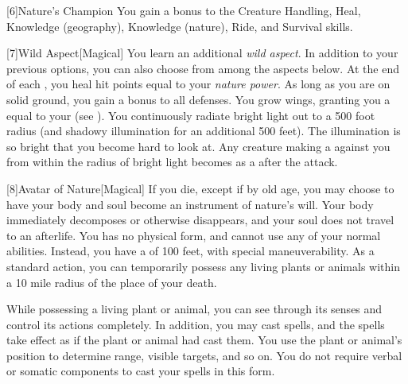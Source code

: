         [6]{Nature's Champion}
        You gain a  bonus to the Creature Handling, Heal, Knowledge (geography), Knowledge (nature), Ride, and Survival skills.

        [7]{Wild Aspect}[Magical]
        You learn an additional \textit{wild aspect}.
        In addition to your previous options, you can also choose from among the aspects below.
        {
            At the end of each , you heal hit points equal to your \textit{nature power}.
             As long as you are on solid ground, you gain a  bonus to all defenses.
            You grow wings, granting you a  equal to your  (see ).
            You continuously radiate bright light out to a 500 foot radius (and shadowy illumination for an additional 500 feet).
            The illumination is so bright that you become hard to look at.
            Any creature making a  against you from within the radius of bright light becomes \dazzled as a  after the attack.
        }

        [8]{Avatar of Nature}[Magical]
        If you die, except if by old age, you may choose to have your body and soul become an instrument of nature's will.
        Your body immediately decomposes or otherwise disappears, and your soul does not travel to an afterlife.
        You has no physical form, and cannot use any of your normal abilities.
        Instead, you have a  of 100 feet, with special maneuverability.
        As a standard action, you can temporarily possess any living plants or animals within a 10 mile radius of the place of your death.

        While possessing a living plant or animal, you can see through its senses and control its actions completely.
        In addition, you may cast spells, and the spells take effect as if the plant or animal had cast them.
        You use the plant or animal's position to determine range, visible targets, and so on.
        You do not require verbal or somatic components to cast your spells in this form.

